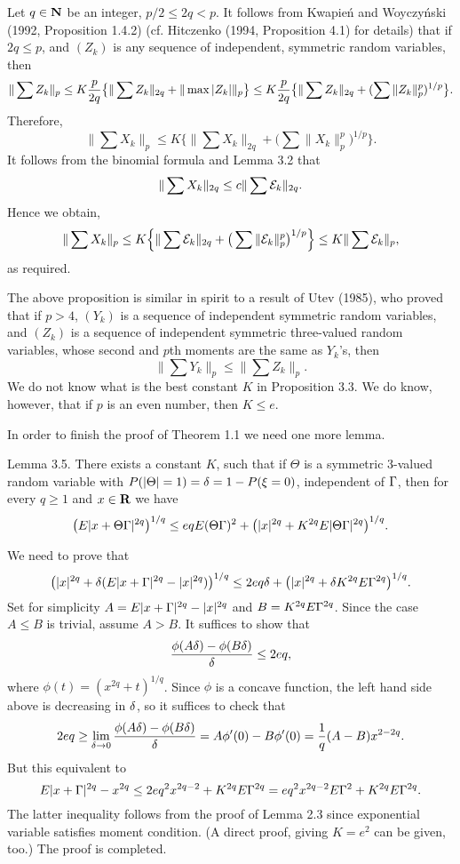 \pf Let $q\in{\bf N}$ be an integer, $p/2\le2q<p$. 
It follows from Kwapie\'n and Woyczy\'nski (1992, Proposition 1.4.2)
(cf. Hitczenko (1994, Proposition 4.1) for details) that if $2q\le p$, and
$(Z_k)$ is any sequence of independent, symmetric random variables, then 
$$
\|\sum Z_k\|_p\le K{p\over 2q}\big\{\|\sum
Z_k\|_{2q}+\|\max|Z_k|\|_p\big\}\le K{p\over 2q}\big\{\|\sum
Z_k\|_{2q}+(\sum\|Z_k\|_p^p)^{1/p}\big\} . $$ 
Therefore,
$$\|\sum X_k\|_p\le K\Big\{\|\sum
X_k\|_{2q}+\big(\sum\|X_k\|_p^p\big)^{1/p}\Big\}.$$ 
It follows from the
binomial formula and
Lemma 3.2 that $$\|\sum
X_k\|_{2q}\le c\|\sum{\cal E}_k\|_{2q}.$$ Hence we obtain,
$$\|\sum X_k\|_p\le K\Big\{\|\sum{\cal E}_k\|_{2q}+\big(\sum\|{\cal
E}_k\|_p^p\big)^{1/p}\Big\}\le K\|\sum{\cal E}_k\|_p,$$
as required.


\bigskip
{} The above proposition is similar in spirit to a
result of Utev
(1985), who proved that if $p>4$, $(Y_k)$ is a sequence of independent
symmetric random
variables, and $(Z_k)$ is a sequence of independent symmetric three-valued
random
variables, whose second and $p$th moments are the same as $Y_k$'s, then
$$\|\sum Y_k\|_p\le \|\sum Z_k\|_p.$$ We do not know what is the best
constant $K$ in
Proposition 3.3. We do know, however, that if $p$ is an even number, then
$K\le e$.

\bigskip\noindent In order
to finish the proof of Theorem
1.1 we need one more lemma.



\proclaim Lemma 3.5. There exists a constant $K$, such that if $\Theta$ is
a symmetric 3-valued
random variable with $P(|\Theta|=1)=\delta=1-P(\xi=0)$, independent of $\Gamma$,
then for
every $q\ge1$ and $x\in{\bf R}$ we have
$$\big(E|x+\Theta\Gamma|^{2q}\big)^{1/q}\le
eqE(\Theta\Gamma)^2+\big(|x|^{2q}+K^{2q}E|\Theta\Gamma|^{2q}\big)^{1/q}. $$

\pf We need to prove that
$$\big(|x|^{2q}+\delta(E|x+\Gamma|^{2q}-|x|^{2q})\big)^{1/q}\le
2eq\delta+\big(|x|^{2q}+\delta K^{2q}E\Gamma^{2q}\big)^{1/q}.$$
Set for simplicity $A=E|x+\Gamma|^{2q}-|x|^{2q}$ and $B=K^{2q}E\Gamma^{2q}$. Since
the case $A\le
B$ is trivial, assume $A>B$. It suffices to show that
$${\phi(A\delta)-\phi(B\delta)\over\delta}\le
2eq,$$
where $\phi(t)=(x^{2q}+t)^{1/q}$.
Since $\phi$ is a concave function, the left hand side above is decreasing
in $\delta$, so
it suffices to check that
$$2eq\ge\lim_{\delta\to0}{\phi(A\delta)-\phi(B\delta)\over\delta}=A\phi'(0)-B\phi'(0)={1\over
q}(A-B)x^{2-2q}.$$ But this equivalent to $$E|x+\Gamma|^{2q}-x^{2q}\le
2eq^2x^{2q-2}+K^{2q}E\Gamma^{2q}=eq^2x^{2q-2}E\Gamma^2+K^{2q}E\Gamma^{2q}. $$ The
latter inequality follows from the proof of Lemma 2.3 since exponential
variable satisfies moment
condition. (A direct proof, giving $K=e^2$ can be given, too.) The proof is
completed.


